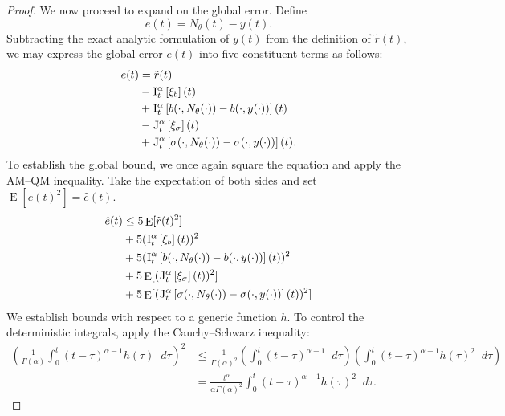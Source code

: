 \documentclass[11pt, a4paper]{article}
\theoremstyle{theoremstyle}
\theoremstyle{definitionstyle}
\newcommand{\dd}{\mathop{}\!d}
\DeclareMathOperator{\EE}{\mathrm E}
\begin{document}
\begin{proof}
    We now proceed to expand on the global error. Define
    \begin{equation}
        e(t) = N_\theta(t) - y(t).
    \end{equation}
    Subtracting the exact analytic formulation of \(y(t)\) from the definition of \(\tilde r(t)\), we may express the global error \(e(t)\) into five constituent terms as follows:
    \begin{equation}
    \begin{aligned}
        e(t) &= \tilde{r}(t) \\ 
        &- \II \left [ \xi_b\right ](t) \\ 
        &+ \II\left [ b(\cdot, N_\theta(\cdot)) - b(\cdot, y(\cdot)) \right ](t) \\ 
        &- \JJ \left [ \xi_\sigma \right ](t) \\ 
        &+ \JJ \left [ \sigma(\cdot, N_\theta(\cdot)) - \sigma(\cdot, y(\cdot)) \right ](t).
    \end{aligned}
    \end{equation}
    To establish the global bound, we once again square the equation and apply the AM--QM inequality. Take the expectation of both sides and set \(\EE [e(t)^2] = \hat e(t)\).
    \begin{equation}
    \begin{aligned}
        \hat e(t) &\leq 5\EE[\tilde r(t)^2] \\
        &+ 5(\II \left [ \xi_b \right ](t))^2 \\
        &+ 5(\II\left [ b(\cdot, N_\theta(\cdot)) - b(\cdot, y(\cdot)) \right ](t))^2 \\
        &+ 5\EE[(\JJ\left [ \xi_\sigma\right ](t))^2] \\
        &+ 5\EE[(\JJ \left [ \sigma(\cdot, N_\theta(\cdot)) - \sigma(\cdot, y(\cdot)) \right ](t))^2]
    \end{aligned}
    \end{equation}
    We establish bounds with respect to a generic function \(h\). To control the deterministic integrals, apply the Cauchy--Schwarz inequality:
    \begin{subequations}
        \begin{align}
            \left ( \frac 1{\Gamma(\alpha)} \int_0^t (t - \tau)^{\alpha-1}h(\tau)\dd{\tau} \right )^2 &\leq \frac 1{\Gamma(\alpha)^2} \left ( \int_0^t (t - \tau)^{\alpha - 1}\dd{\tau}\right ) \left ( \int_0^t (t - \tau)^{\alpha - 1}h(\tau)^2\dd{\tau}\right ) \\
            &= \frac{t^\alpha}{\alpha\Gamma(\alpha)^2} \int_0^t (t - \tau)^{\alpha-1}h(\tau)^2\dd{\tau}. \label{eq:56b}

\end{align}
\end{subequations}
\end{proof}
\end{document}
